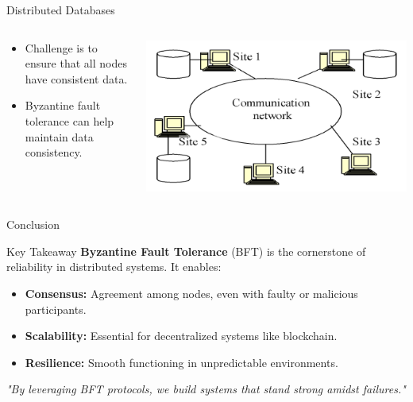 \documentclass{beamer}
\begin{document}
\begin{frame}{Distributed Databases}
    \begin{columns}
        \begin{column}{0.5\textwidth}
            \begin{itemize}
                \item Challenge is to ensure that all nodes have consistent data.\pause
                \item Byzantine fault tolerance can help maintain data consistency.
            \end{itemize}
        \end{column}

        \begin{column}{0.5\textwidth}
            \centering
            \includegraphics[width=\textwidth]{image3/Distributed-database-system.png}
        \end{column}
    \end{columns}
\end{frame}




\begin{frame}{Conclusion}
    \begin{alertblock}{Key Takeaway}
        \textbf{Byzantine Fault Tolerance} (BFT) is the cornerstone of reliability in distributed systems. It enables:
        \begin{itemize}
            \item \textbf{Consensus:} Agreement among nodes, even with faulty or malicious participants.
            \item \textbf{Scalability:} Essential for decentralized systems like blockchain.
            \item \textbf{Resilience:} Smooth functioning in unpredictable environments.
        \end{itemize}
    \end{alertblock}
    \vfill
    \centering
    \textit{"By leveraging BFT protocols, we build systems that stand strong amidst failures."}
\end{frame}
\end{document}
